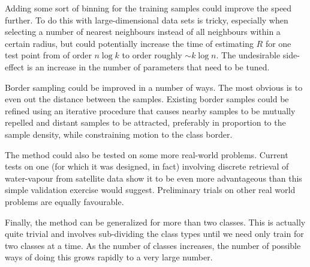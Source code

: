 Adding some sort of binning for the training samples could improve
the speed further.  To do this with large-dimensional data
sets is tricky, especially when selecting a number of nearest
neighbours instead of all neighbours within a certain radius, but
could potentially increase the time of estimating $R$ for one test point
from of order $n \log k$ to order roughly $\sim k \log n$.  
The undesirable side-effect is an increase in the number of parameters
that need to be tuned.

Border sampling could be improved in a number of ways.  The most
obvious is to even out the distance between the samples.
Existing border samples could be refined using an iterative procedure
that causes nearby samples to be mutually repelled and distant
samples to be attracted, preferably in proportion to the sample
density, while constraining motion to the class
border.

The method could also be tested on some more real-world problems.
Current tests on one (for which it was designed,
in fact) involving discrete
retrieval of water-vapour from satellite data 
show it to be even more advantageous than this
simple validation exercise would suggest.  Preliminary trials
 on other real world problems are equally favourable.

Finally, the method can be generalized for more than two
classes.  This is actually quite trivial and involves
sub-dividing the class types until we need only train for
two classes at a time.  As the number of classes increases,
the number of possible ways of doing this grows 
rapidly to a very large number.

